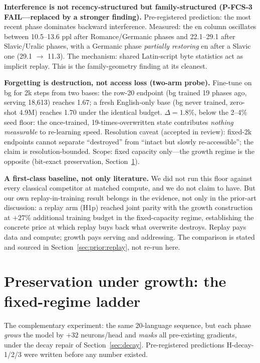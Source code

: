 \documentclass[11pt]{article}
\theoremstyle{definition}\newtheorem{definition}{Definition}
\theoremstyle{remark}\newtheorem{remark}{Remark}
\begin{document}
\textbf{Interference is not recency-structured but family-structured (P-FCS-3
FAIL---replaced by a stronger finding).} Pre-registered prediction: the most recent phase
dominates backward interference. Measured: the en column oscillates between 10.5--13.6 ppl
after Romance/Germanic phases and 22.1--29.1 after Slavic/Uralic phases, with a Germanic
phase \emph{partially restoring} en after a Slavic one (29.1 $\to$ 11.3). The mechanism:
shared Latin-script byte statistics act as implicit replay. This is the family-geometry
finding at its cleanest.

\textbf{Forgetting is destruction, not access loss (two-arm probe).} Fine-tune on bg for
2k steps from two bases: the row-20 endpoint (bg trained 19 phases ago, serving 18{,}613)
reaches 1.67; a fresh English-only base (bg never trained, zero-shot 4.9M) reaches 1.70
under the identical budget. $\Delta=1.8\%$, below the 2--4\% seed floor: the once-trained,
19-times-overwritten state contributes \emph{nothing measurable} to re-learning speed.
Resolution caveat (accepted in review): fixed-2k endpoints cannot separate ``destroyed''
from ``intact but slowly re-accessible''; the claim is resolution-bounded. Scope: fixed
capacity only---the growth regime is the opposite (bit-exact preservation,
Section~\ref{sec:ra2b}).

\textbf{A first-class baseline, not only literature.} We did not run this floor
against every classical competitor at matched compute, and we do not claim to have. But our
own replay-in-training result belongs in the evidence, not only in the prior-art discussion:
a replay arm (H1p) reached joint parity with the growth construction at $+27\%$ additional
training budget in the fixed-capacity regime, establishing the concrete price at which
replay buys back what overwrite destroys. Replay pays data and compute; growth pays
serving and addressing. The comparison is stated and sourced in
Section~\ref{sec:prior:replay}, not re-run here.

\section{Preservation under growth: the fixed-regime ladder}
\label{sec:ra2b}

The complementary experiment: the same 20-language sequence, but each phase \emph{grows}
the model by $+32$ neurons/head and \emph{masks} all pre-existing gradients, under the
decay repair of Section~\ref{sec:decay}. Pre-registered predictions H-decay-1/2/3 were
written before any number existed.
\end{document}
